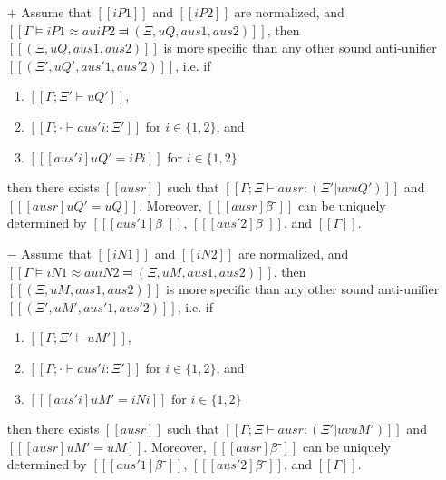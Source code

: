 \begin{lemma} \label{lemma:anti-unification-initial}
    \hfill
    \begin{itemize}
        \item [$+$] 
            Assume that $[[iP1]]$ and $[[iP2]]$ are normalized, and
            $[[Γ ⊨ iP1 ≈au iP2 ⫤ (Ξ, uQ, aus1, aus2)]]$, 
            then $[[(Ξ, uQ, aus1, aus2)]]$ is more specific than
            any other sound anti-unifier $[[(Ξ', uQ', aus'1, aus'2)]]$, i.e.
            if 
            \begin{enumerate}
                \item $[[Γ ; Ξ' ⊢ uQ']]$,
                \item $[[Γ ; · ⊢ aus'i : Ξ']]$ for $i \in \{1,2\}$, and
                \item $[[ [aus'i] uQ' = iPi ]]$ for $i \in \{1,2\}$
            \end{enumerate}
            then there exists $[[ausr]]$ such that
            $[[Γ ; Ξ ⊢ ausr : (Ξ' | uv uQ')]]$ and $[[ [ausr] uQ' = uQ ]]$. 
            Moreover, $[[ [ausr]β̂⁻]]$ can
            be uniquely determined by $[[ [aus'1]β̂⁻ ]]$, $[[ [aus'2]β̂⁻ ]]$, and
            $[[Γ]]$.
        \item [$-$] 
            Assume that $[[iN1]]$ and $[[iN2]]$ are normalized, and
            $[[Γ ⊨ iN1 ≈au iN2 ⫤ (Ξ, uM, aus1, aus2)]]$, 
            then $[[(Ξ, uM, aus1, aus2)]]$ is more specific than
            any other sound anti-unifier $[[(Ξ', uM', aus'1, aus'2)]]$, i.e.
            if
            \begin{enumerate}
                \item $[[Γ ; Ξ' ⊢ uM']]$,
                \item $[[Γ ; · ⊢ aus'i : Ξ']]$ for $i \in \{1,2\}$, and
                \item $[[ [aus'i] uM' = iNi ]]$ for $i \in \{1,2\}$
            \end{enumerate}
            then there exists $[[ausr]]$ such that
            $[[Γ ; Ξ ⊢ ausr : (Ξ' | uv uM')]]$ and $[[ [ausr] uM' = uM ]]$.
            Moreover, $[[ [ausr]β̂⁻]]$ can
            be uniquely determined by $[[ [aus'1]β̂⁻ ]]$, $[[ [aus'2]β̂⁻ ]]$, and
            $[[Γ]]$.
    \end{itemize}
\end{lemma}
